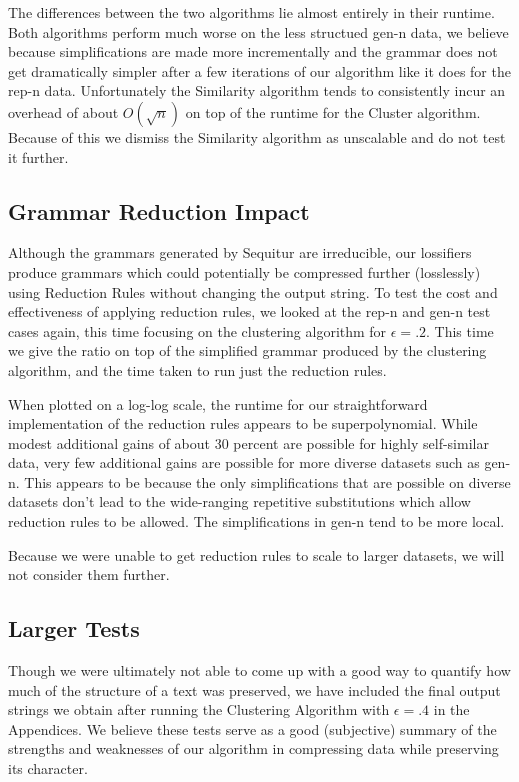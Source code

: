 \documentclass[11pt]{article}
\begin{document}
The differences between the two algorithms lie almost entirely in their
runtime. Both algorithms perform much worse on the less structued
gen-n data, we believe because simplifications are made more incrementally
and the grammar does not get dramatically simpler after a few iterations
of our algorithm like it does for the rep-n data.
Unfortunately the Similarity algorithm tends to consistently incur
an overhead of about $O(\sqrt{n})$ on top of the runtime for the
Cluster algorithm. Because of this we dismiss the Similarity algorithm
as unscalable and do not test it further.

\subsection{Grammar Reduction Impact}
Although the grammars generated by Sequitur are irreducible,
our lossifiers produce grammars which could potentially be
compressed further (losslessly) using Reduction Rules without
changing the output string. To test the cost and
effectiveness of applying reduction rules, we looked at the
rep-n and gen-n test cases again, this time focusing on the
clustering algorithm for $\epsilon = .2$. This time we give the ratio
on top of the simplified grammar produced by the clustering algorithm,
and the time taken to run just the reduction rules.

When plotted on a log-log scale, the runtime for our straightforward 
implementation of the reduction
rules appears to be superpolynomial. While modest additional gains of about 30 percent
are possible for highly self-similar data, very few additional gains are
possible for more diverse datasets such as gen-n. This appears to be because
the only simplifications that are possible on diverse datasets don't lead to
the wide-ranging repetitive substitutions which allow reduction rules to be allowed.
The simplifications in gen-n tend to be more local.

Because we were unable to get reduction rules to scale to larger datasets,
we will not consider them further.


\subsection{Larger Tests}

Though we were ultimately not able to come up with a good way to quantify how much of the
structure of a text was preserved, we have included the final output strings we obtain
after running the Clustering Algorithm with $\epsilon = .4$ in the Appendices. We
believe these tests serve as a good (subjective) summary of the strengths and
weaknesses of our
algorithm in compressing data while preserving
its character.
\end{document}
